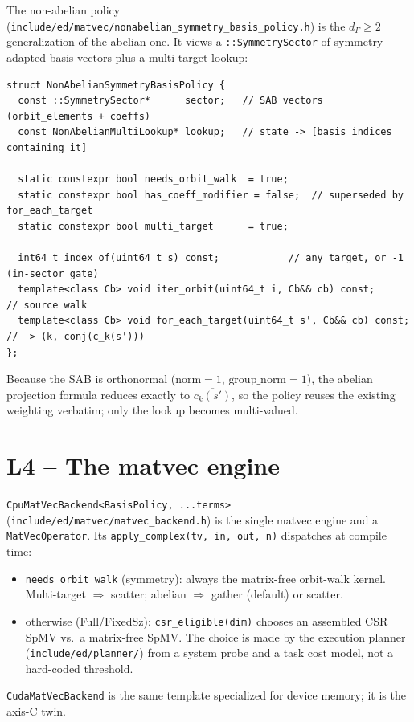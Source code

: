\documentclass[11pt]{article}
\newcommand{\code}[1]{\texttt{\small #1}}
\newcommand{\file}[1]{\texttt{\footnotesize #1}}
\begin{document}
The non-abelian policy
(\file{include/ed/matvec/nonabelian\_symmetry\_basis\_policy.h}) is the
$d_\Gamma\!\ge\!2$ generalization of the abelian one. It views a
\code{::SymmetrySector} of symmetry-adapted basis vectors plus a
multi-target lookup:
\begin{lstlisting}
struct NonAbelianSymmetryBasisPolicy {
  const ::SymmetrySector*      sector;   // SAB vectors (orbit_elements + coeffs)
  const NonAbelianMultiLookup* lookup;   // state -> [basis indices containing it]

  static constexpr bool needs_orbit_walk  = true;
  static constexpr bool has_coeff_modifier = false;  // superseded by for_each_target
  static constexpr bool multi_target      = true;

  int64_t index_of(uint64_t s) const;            // any target, or -1 (in-sector gate)
  template<class Cb> void iter_orbit(uint64_t i, Cb&& cb) const;       // source walk
  template<class Cb> void for_each_target(uint64_t s', Cb&& cb) const; // -> (k, conj(c_k(s')))
};
\end{lstlisting}
Because the SAB is orthonormal ($\text{norm}=1$, $\text{group\_norm}=1$),
the abelian projection formula reduces exactly to $\overline{c_k(s')}$,
so the policy reuses the existing weighting verbatim; only the lookup
becomes multi-valued.

\section{L4 -- The matvec engine}

\code{CpuMatVecBackend<BasisPolicy, ...terms>}
(\file{include/ed/matvec/matvec\_backend.h}) is the single matvec
engine and a \code{MatVecOperator}. Its \code{apply\_complex(tv, in,
out, n)} dispatches at compile time:
\begin{itemize}[nosep]
  \item \code{needs\_orbit\_walk} (symmetry): always the matrix-free
  orbit-walk kernel. Multi-target $\Rightarrow$ scatter; abelian
  $\Rightarrow$ gather (default) or scatter.
  \item otherwise (Full/FixedSz): \code{csr\_eligible(dim)} chooses an
  assembled CSR SpMV vs.\ a matrix-free SpMV. The choice is made by the
  execution planner (\file{include/ed/planner/}) from a system probe and
  a task cost model, not a hard-coded threshold.
\end{itemize}
\code{CudaMatVecBackend} is the same template specialized for device
memory; it is the axis-C twin.
\end{document}
